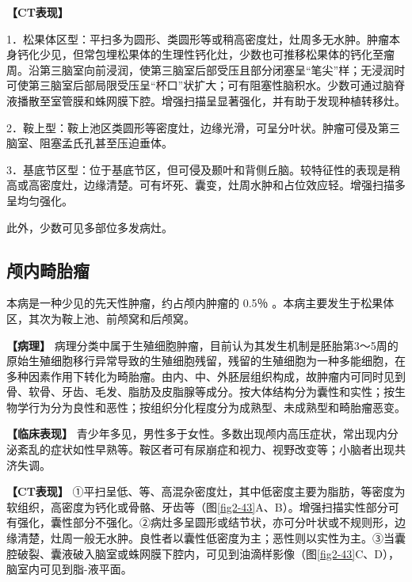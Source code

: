 \textbf{【CT表现】}

1．松果体区型：平扫多为圆形、类圆形等或稍高密度灶，灶周多无水肿。肿瘤本身钙化少见，但常包埋松果体的生理性钙化灶，少数也可推移松果体的钙化至瘤周。沿第三脑室向前浸润，使第三脑室后部受压且部分闭塞呈“笔尖”样；无浸润时可使第三脑室后部局限受压呈“杯口”状扩大；可有阻塞性脑积水。少数可通过脑脊液播散至室管膜和蛛网膜下腔。增强扫描呈显著强化，并有助于发现种植转移灶。

2．鞍上型：鞍上池区类圆形等密度灶，边缘光滑，可呈分叶状。肿瘤可侵及第三脑室、阻塞孟氏孔甚至压迫垂体。

3．基底节区型：位于基底节区，但可侵及颞叶和背侧丘脑。较特征性的表现是稍高或高密度灶，边缘清楚。可有坏死、囊变，灶周水肿和占位效应轻。增强扫描多呈均匀强化。

此外，少数可见多部位多发病灶。

\subsection{颅内畸胎瘤}

本病是一种少见的先天性肿瘤，约占颅内肿瘤的 0.5％
。本病主要发生于松果体区，其次为鞍上池、前颅窝和后颅窝。

\textbf{【病理】}
病理分类中属于生殖细胞肿瘤，目前认为其发生机制是胚胎第3～5周的原始生殖细胞移行异常导致的生殖细胞残留，残留的生殖细胞为一种多能细胞，在多种因素作用下转化为畸胎瘤。由内、中、外胚层组织构成，故肿瘤内可同时见到骨、软骨、牙齿、毛发、脂肪及皮脂腺等成分。按大体结构分为囊性和实性；按生物学行为分为良性和恶性；按组织分化程度分为成熟型、未成熟型和畸胎瘤恶变。

\textbf{【临床表现】}
青少年多见，男性多于女性。多数出现颅内高压症状，常出现内分泌紊乱的症状如性早熟等。鞍区者可有尿崩症和视力、视野改变等；小脑者出现共济失调。

\textbf{【CT表现】}
①平扫呈低、等、高混杂密度灶，其中低密度主要为脂肪，等密度为软组织，高密度为钙化或骨骼、牙齿等（图\ref{fig2-43}A、B）。增强扫描实性部分可有强化，囊性部分不强化。②病灶多呈圆形或结节状，亦可分叶状或不规则形，边缘清楚，灶周一般无水肿。良性者以囊性低密度为主；恶性则以实性为主。③当囊腔破裂、囊液破入脑室或蛛网膜下腔内，可见到油滴样影像（图\ref{fig2-43}C、D），脑室内可见到脂-液平面。

